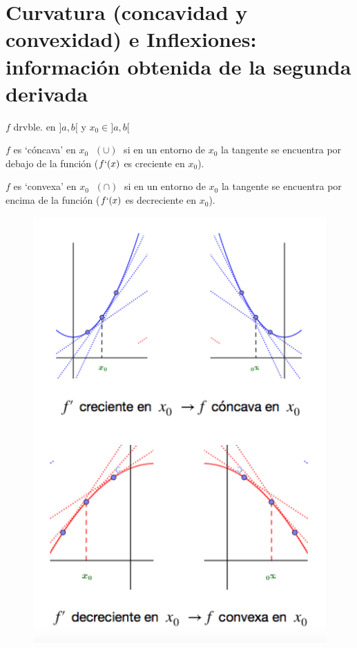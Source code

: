 	
\section[Curvatura (concavidad y convexidad) e Inflexiones: información obtenida de la segunda derivada]{Curvatura (concavidad y convexidad) e Inflexiones: información obtenida de la segunda derivada}


	$f$ drvble. en $]a,b[$ y $x_0\in ]a,b[$
	
	\begin{defi} $f$ es `cóncava' en $x_0$ $\; (\cup)\; $ si en un entorno de $x_0$ la tangente se encuentra por debajo de la función ($f`(x)$ es creciente en $x_0$).
		
	\end{defi}
	
	\begin{defi} $f$ es `convexa' en $x_0$ $\; (\cap)\; $ si en un entorno de $x_0$ la tangente se encuentra por encima de la función ($f`(x)$ es decreciente en $x_0$).
		
	\end{defi}

	
	\begin{figure}[H]
	\centering
	\includegraphics[width=.5\textwidth]{imagenes/imagenes05/T05IM14.png}
	\end{figure}
	
	

